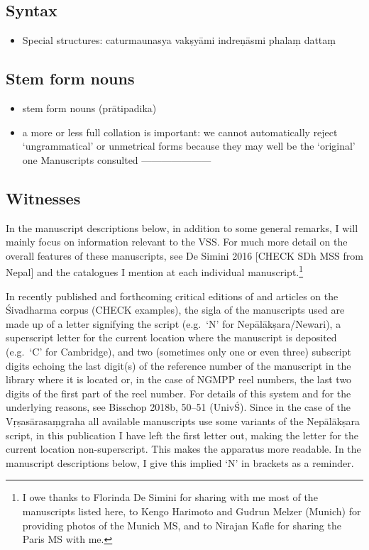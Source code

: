 \documentclass[]{article}
\providecommand{\tightlist}{%
  \setlength{\itemsep}{0pt}\setlength{\parskip}{0pt}}
\begin{document}
\hypertarget{syntax}{%
\subsection{Syntax}\label{syntax}}

\begin{itemize}
\tightlist
\item
  Special structures: caturmaunasya vakṣyāmi indreṇāsmi phalaṃ dattaṃ
\end{itemize}

\hypertarget{stem-form-nouns}{%
\subsection{Stem form nouns}\label{stem-form-nouns}}

\begin{itemize}
\item
  stem form nouns (prātipadika)
\item
  a more or less full collation is important: we cannot automatically
  reject `ungrammatical' or unmetrical forms because they may well be
  the `original' one Manuscripts consulted ---------------------
\end{itemize}

\hypertarget{witnesses}{%
\subsection{Witnesses}\label{witnesses}}

In the manuscript descriptions below, in addition to some general
remarks, I will mainly focus on information relevant to the VSS. For
much more detail on the overall features of these manuscripts, see De
Simini 2016 {[}CHECK SDh MSS from Nepal{]} and the catalogues I mention
at each individual manuscript.\footnote{I owe thanks to Florinda De
  Simini for sharing with me most of the manuscripts listed here, to
  Kengo Harimoto and Gudrun Melzer (Munich) for providing photos of the
  Munich MS, and to Nirajan Kafle for sharing the Paris MS with me.}

In recently published and forthcoming critical editions of and articles
on the Śivadharma corpus (CHECK examples), the sigla of the manuscripts
used are made up of a letter signifying the script (e.g.~`N' for
Nepālākṣara/Newari), a superscript letter for the current location where
the manuscript is deposited (e.g.~`C' for Cambridge), and two (sometimes
only one or even three) subscript digits echoing the last digit(s) of
the reference number of the manuscript in the library where it is
located or, in the case of NGMPP reel numbers, the last two digits of
the first part of the reel number. For details of this system and for
the underlying reasons, see Bisschop 2018b, 50--51 (UnivŚ). Since in the
case of the Vṛṣasārasaṃgraha all available manuscripts use some variants
of the Nepālākṣara script, in this publication I have left the first
letter out, making the letter for the current location non-superscript.
This makes the apparatus more readable. In the manuscript descriptions
below, I give this implied `N' in brackets as a reminder.
\end{document}
